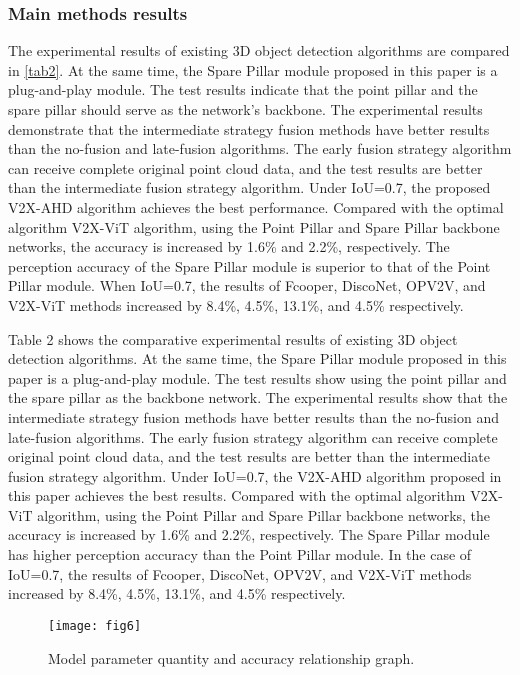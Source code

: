 \documentclass[lettersize,journal]{IEEEtran}
\begin{document}
\subsubsection{Main methods results}
The experimental results of existing 3D object detection algorithms are compared in \ref{tab2}. At the same time, the Spare Pillar module proposed in this paper is a plug-and-play module. The test results indicate that the point pillar and the spare pillar should serve as the network's backbone. The experimental results demonstrate that the intermediate strategy fusion methods have better results than the no-fusion and late-fusion algorithms. The early fusion strategy algorithm can receive complete original point cloud data, and the test results are better than the intermediate fusion strategy algorithm. Under IoU=0.7, the proposed V2X-AHD algorithm achieves the best performance. Compared with the optimal algorithm V2X-ViT algorithm, using the Point Pillar and Spare Pillar backbone networks, the accuracy is increased by 1.6\% and 2.2\%, respectively. The perception accuracy of the Spare Pillar module is superior to that of the Point Pillar module. When IoU=0.7, the results of Fcooper, DiscoNet, OPV2V, and V2X-ViT methods increased by 8.4\%, 4.5\%, 13.1\%, and 4.5\% respectively.


Table 2 shows the comparative experimental results of existing 3D object detection algorithms. At the same time, the Spare Pillar module proposed in this paper is a plug-and-play module. The test results show using the point pillar and the spare pillar as the backbone network. The experimental results show that the intermediate strategy fusion methods have better results than the no-fusion and late-fusion algorithms. The early fusion strategy algorithm can receive complete original point cloud data, and the test results are better than the intermediate fusion strategy algorithm. Under IoU=0.7, the V2X-AHD algorithm proposed in this paper achieves the best results. Compared with the optimal algorithm V2X-ViT algorithm, using the Point Pillar and Spare Pillar backbone networks, the accuracy is increased by 1.6\% and 2.2\%, respectively. The Spare Pillar module has higher perception accuracy than the Point Pillar module. In the case of IoU=0.7, the results of Fcooper, DiscoNet, OPV2V, and V2X-ViT methods increased by 8.4\%, 4.5\%, 13.1\%, and 4.5\% respectively.

\begin{figure}[!t]
\texttt{[image: fig6]}
\caption{Model parameter quantity and accuracy relationship graph.}
\label{fig_6}
\end{figure}
\end{document}
